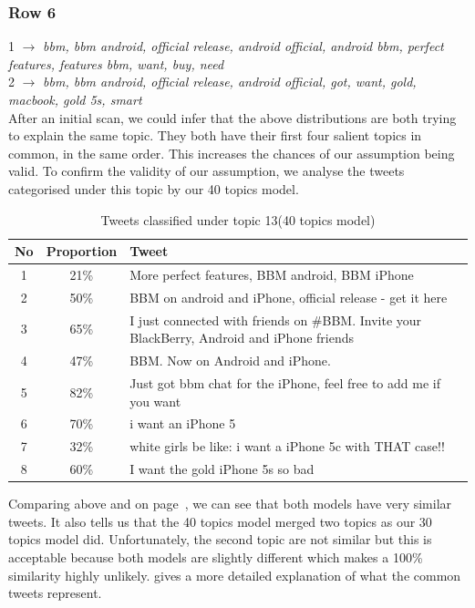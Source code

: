 \subsubsection*{Row 6}
1 $\rightarrow$ \textit{bbm, bbm android, official release, android official, android bbm, perfect features, features bbm, want, buy, need}  \\
2 $\rightarrow$ \textit{bbm, bbm android, official release, android official, got, want, gold, macbook, gold 5s, smart}   \\

After an initial scan, we could infer that the above distributions are both trying to explain the
same topic. They both have their first four salient topics in common, in the same order. This
increases the chances of our assumption being valid. To confirm the validity of our assumption, we
analyse the tweets categorised under this topic by our 40 topics model.

\begin{table}[H]
  \begin{tabular}{c c p{13cm}} \toprule
    No  & Proportion & Tweet \\ \midrule
    1   & 21\%       & More perfect features, BBM android, BBM iPhone \\ \midrule
    2   & 50\%       & BBM on android and iPhone, official release - get it here \\ \midrule
    3   & 65\%       & I just connected with friends on \#BBM\@. Invite your BlackBerry, Android and iPhone friends \\ \midrule
    4   & 47\%       & BBM\@. Now on Android and iPhone. \\ \midrule
    5   & 82\%       & Just got bbm chat for the iPhone, feel free to add me if you want \\ \midrule
    6   & 70\%       & i want an iPhone 5 \\ \midrule
    7   & 32\%       & white girls be like: i want a iPhone 5c with THAT case!! \\ \midrule
    8   & 60\%       & I want the gold iPhone 5s so bad \\ \bottomrule
  \end{tabular}
  \caption{Tweets classified under topic 13(40 topics model)}
  \label{tab:topic-13-tweets-topic-40}
\end{table}

Comparing  above and  on
page~\pageref{tab:topic-27-tweets}, we can see that both models have very similar tweets. It also
tells us that the 40 topics model merged two topics as our 30 topics model did. Unfortunately, the
second topic are not similar but this is acceptable because both models are slightly different which
makes a 100\% similarity highly unlikely.  gives a more detailed
explanation of what the common tweets represent.





